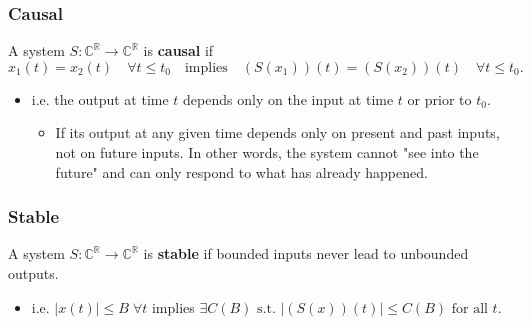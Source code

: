     \begin{example}
    \end{example}

    \subsubsection{Causal}
    \begin{definition}
        A system \( S: \mathbb{C}^{\mathbb{R}} \to \mathbb{C}^{\mathbb{R}} \) is \textbf{causal} if
        \[
        x_1(t) = x_2(t) \quad \forall t \leq t_0 \quad \text{implies} \quad (S(x_1))(t) = (S(x_2))(t) \quad \forall t \leq t_0.
        \]

        \begin{itemize}
            \item i.e. the output at time \( t \) depends only on the input at time \( t \) or prior to \( t_0 \).
            \begin{itemize}
                \item  If its output at any given time depends only on present and past inputs, not on future inputs. In other words, the system cannot "see into the future" and can only respond to what has already happened.
            \end{itemize}
        \end{itemize}
    \end{definition}

    \begin{example}
    \end{example}

    \subsubsection{Stable}
    \begin{definition}
        A system \( S: \mathbb{C}^{\mathbb{R}} \to \mathbb{C}^{\mathbb{R}} \) is \textbf{stable} if bounded inputs never lead to unbounded outputs.\\
        
        \begin{itemize}
            \item i.e. $|x(t)| \leq B \; \forall t$ implies $\exists C(B) \text{ s.t. } |(S(x))(t)| \leq C(B) \text{ for all } t.$
        \end{itemize}
    \end{definition}

    \begin{example}
    \end{example}
